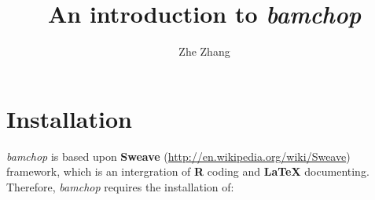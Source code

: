 \documentclass{article}
\begin{document}
\begin{titlepage}
\title{An introduction to \textit{bamchop}}
\author{Zhe Zhang}
\maketitle
\tableofcontents
\end{titlepage}

\section{Installation}

\textit{bamchop} is based upon \textbf{Sweave} (\url{http://en.wikipedia.org/wiki/Sweave}) framework, which is an intergration of \textbf{R} coding and \textbf{LaTeX} documenting. Therefore, \textit{bamchop} requires the installation of:
\end{document}
